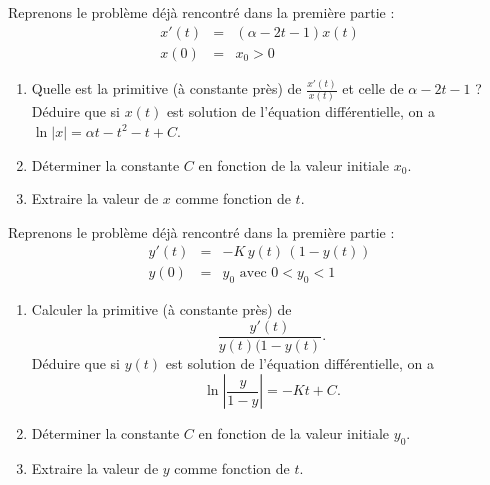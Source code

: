 \begin{exo}
Reprenons le problème déjà rencontré dans la première partie :
 \begin{eqnarray}
            x'(t) & = & (\alpha - 2t -1)x(t) \label{ncdiffx} \\
            x(0)  & = & x_0 > 0 \label{cix}
        \end{eqnarray}

\begin{enumerate}
\item Quelle est la primitive (à constante près) de $\frac{x'(t)}{x(t)}$ et celle de $\alpha -2t -1$ ? Déduire que si $x(t)$ est solution de l'équation différentielle,
on a $\ln| x| = \alpha t - t^2 -t + C$.
\item Déterminer la constante $C$ en fonction de la valeur initiale $x_0$.
\item Extraire la valeur de $x$ comme fonction de $t$.

\end{enumerate}
\end{exo}
\begin{exo}
Reprenons le problème déjà rencontré dans la première partie :
 \begin{eqnarray}
            y'(t) & = & - K \, y(t) \, (1-y(t)) \\
            y(0)  & = & y_0  \text{ avec } 0 < y_0 < 1 \label{cix}
        \end{eqnarray}

\begin{enumerate}
\item Calculer la primitive (à constante près) de $$\frac{y'(t)}{y(t)(1-y(t)}.$$ 
 Déduire que si $y(t)$ est solution  de l'équation différentielle,
on a $$\ln |\frac{y}{1-y}| = -Kt + C.$$
\item Déterminer la constante $C$ en fonction de la valeur initiale $y_0$.
\item Extraire la valeur de $y$ comme fonction de $t$.
\end{enumerate}
\end{exo}

